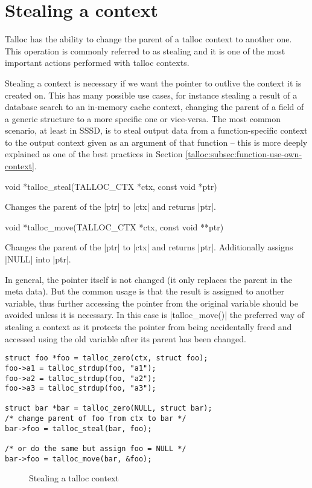 \section{Stealing a context}
\label{talloc:stealing}

Talloc has the ability to change the parent of a talloc context to another
one. This operation is commonly referred to as stealing and it is one of
the most important actions performed with talloc contexts.

Stealing a context is necessary if we want the pointer to outlive the context it
is created on. This has many possible use cases, for instance stealing a result
of a database search to an in-memory cache context, changing the parent of a
field of a generic structure to a more specific one or vice-versa. The most
common scenario, at least in SSSD, is to steal output data from a function-specific
context to the output context given as an argument of that function -- this is
more deeply explained as one of the best practices in Section 
\ref{talloc:subsec:function-use-own-context}.

\begin{funcproto}
void *talloc_steal(TALLOC_CTX *ctx, const void *ptr)
\end{funcproto}
\begin{funcdesc}
  Changes the parent of the |ptr| to |ctx| and returns |ptr|.
\end{funcdesc}
\begin{funcproto}
void *talloc_move(TALLOC_CTX *ctx, const void **ptr)
\end{funcproto}
\begin{funcdesc}
  Changes the parent of the |ptr| to |ctx| and returns |ptr|.
  Additionally assigns |NULL| into |ptr|.
\end{funcdesc}
\funclistend
In general, the pointer itself is not changed (it only replaces the
parent in the meta data). But the common usage is that the result is assigned
to another variable, thus further accessing the pointer from the original
variable should be avoided unless it is necessary. In this case is
|talloc_move()| the preferred way of stealing a context as it protects the
pointer from being accidentally freed and accessed using the old variable after
its parent has been changed.

\begin{lstlisting}[caption={talloc_steal() and talloc_move()}]
struct foo *foo = talloc_zero(ctx, struct foo);
foo->a1 = talloc_strdup(foo, "a1");
foo->a2 = talloc_strdup(foo, "a2");
foo->a3 = talloc_strdup(foo, "a3");

struct bar *bar = talloc_zero(NULL, struct bar);
/* change parent of foo from ctx to bar */
bar->foo = talloc_steal(bar, foo);

/* or do the same but assign foo = NULL */
bar->foo = talloc_move(bar, &foo);
\end{lstlisting}

\begin{figure}[H]
  \centering
  
  \caption{Stealing a talloc context}
  \label{fig:steal}
\end{figure}
